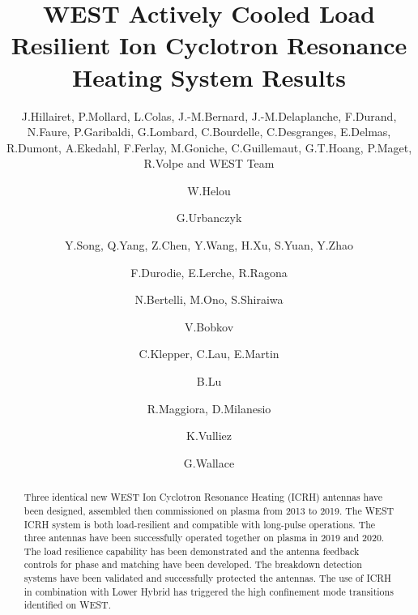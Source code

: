 \documentclass[12p]{iopart}
\begin{document}
\title[WEST ICRH System Results]{WEST Actively Cooled Load Resilient Ion Cyclotron Resonance Heating System Results}

\author{J.Hillairet, P.Mollard, L.Colas, J.-M.Bernard, J.-M.Delaplanche, F.Durand, N.Faure, P.Garibaldi, G.Lombard, C.Bourdelle, C.Desgranges, E.Delmas, R.Dumont, A.Ekedahl, F.Ferlay, M.Goniche, C.Guillemaut, G.T.Hoang, P.Maget, R.Volpe and WEST Team}
\address{CEA, IRFM,	F-13108 St-Paul-Lez-Durance, France}

\author{W.Helou}
\address{Iter Organization
Route De Vinon-Sur-Verdon, Cs 90 046, 13067 St. Paul Lez Durance Cedex, France}

\author{G.Urbanczyk}
\address{Key Laboratory Of Optoelectronic Devices And Systems, College Of Physics And Optoelectronic Engineering
Shenzhen University, Shenzhen 518060, China}

\author{Y.Song, Q.Yang, Z.Chen, Y.Wang, H.Xu, S.Yuan, Y.Zhao}
\address{Institute Of Plasma Physics, Cas
Hefei, Anhui 230031, Pr China}

\author{F.Durodie, E.Lerche, R.Ragona}
\address{Laboratory For Plasma Physics, Royal Military Academy 
1000 Bruxelles, Belgium}

\author{N.Bertelli, M.Ono, S.Shiraiwa}
\address{Princeton Plasma Physics Laboratory
Princeton, Nj 08543, Usa}

\author{V.Bobkov}
\address{Max-Planck Institut Für Plasmaphysik
Boltzmannstraße 2, 85748 Garching, Germany}

\author{C.Klepper, C.Lau, E.Martin}
\address{Oak Ridge National Laboratory
1 Bethel Valley Rd, Oak Ridge, Tn 37830}

\author{B.Lu}
\address{Southwestern Institute Of Physics 
Po Box 432, Chengdu 610041, Pr China}

\author{R.Maggiora, D.Milanesio}
\address{Politecnico Di Torino, Department Of Electronics And Telecommunications}

\author{K.Vulliez}
\address{Cea, Liten 
F-38054 Grenoble, France}

\author{G.Wallace}
\address{Plasma Science And Fusion Center, Mit 
Cambridge, Ma, 02139, Usa}

\vspace{10pt}

\begin{abstract}
Three identical new WEST Ion Cyclotron Resonance Heating (ICRH) antennas have been designed, assembled then commissioned on plasma from 2013 to 2019. The WEST ICRH system is both load-resilient and compatible with long-pulse operations. The three antennas have been successfully operated together on plasma in 2019 and 2020. The load resilience capability has been demonstrated and the antenna feedback controls for phase and matching have been developed. The breakdown detection systems have been validated and successfully protected the antennas. The use of ICRH in combination with Lower Hybrid has triggered the high confinement mode transitions identified on WEST.
\end{abstract}
\end{document}
